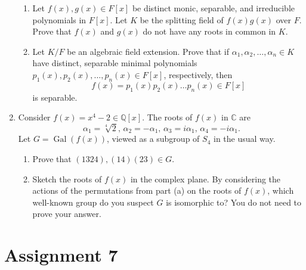\documentclass[notoc,notitlepage,nobib]{tufte-book}
\DeclareMathOperator{\Gal}{Gal}
\begin{document}
\begin{enumerate}
\begin{enumerate}
      \item Let $f(x), g(x) \in F[x]$ be distinct monic, separable, and
        irreducible polynomials in $F[x]$. Let $K$ be the splitting field of
        $f(x) g(x)$ over $F$. Prove that $f(x)$ and $g(x)$ do not have any roots
        in common in $K$.
      \item Let $K / F$ be an algebraic field extension. Prove that if
        $\alpha_1, \alpha_2, \ldots, \alpha_n \in K$ have distinct, separable
        minimal polynomials $p_1(x), p_2(x), \ldots, p_n(x) \in F[x]$,
        respectively, then
        \begin{equation*}
          f(x) = p_1(x) p_2(x) \hdots p_n(x) \in F[x]
        \end{equation*}
        is separable.
    \end{enumerate}
  \item Consider $f(x) = x^4 - 2 \in \mathbb{Q}[x]$. The roots of $f(x)$ in
    $\mathbb{C}$ are
    \begin{equation*}
      \alpha_1 = \sqrt[4]{2}, \, \alpha_2 = -\alpha_1, \, \alpha_3 = i \alpha_1,
      \, \alpha_4 = -i \alpha_1.
    \end{equation*}
    Let $G = \Gal(f(x))$, viewed as a subgroup of $S_4$ in the usual way.
    \begin{enumerate}
      \item Prove that $(1324), (14)(23) \in G$.
      \item Sketch the roots of $f(x)$ in the complex plane. By considering the
        actions of the permutations from part (a) on the roots of $f(x)$, which
        well-known group do you suspect $G$ is isomorphic to? You do not need to
        prove your answer.
    \end{enumerate}
\end{enumerate}


\section{Assignment 7}%
\label{sec:assignment_7}
\end{document}
